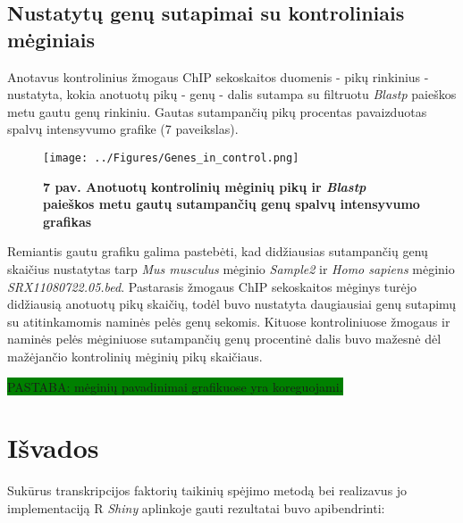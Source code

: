 \documentclass[12pt]{article}
\begin{document}
\newpage

\subsection{Nustatytų genų sutapimai su kontroliniais mėginiais}
Anotavus kontrolinius žmogaus ChIP sekoskaitos duomenis - pikų rinkinius -
nustatyta, kokia anotuotų pikų - genų - dalis sutampa su filtruotu \emph{Blastp}
paieškos metu gautu genų rinkiniu. Gautas sutampančių pikų procentas
pavaizduotas spalvų intensyvumo grafike (7 paveikslas).

\begin{figure}[ht]
    \begin{center}
        \captionsetup{justification=centering}
        \texttt{[image: ../Figures/Genes\_in\_control.png]}
        \vspace{-1.5\baselineskip}
        \caption*{\small\textbf{7 pav. Anotuotų kontrolinių mėginių pikų ir
                                \emph{Blastp} paieškos metu gautų sutampančių
                                genų spalvų intensyvumo grafikas}}
    \end{center}
\end{figure}

Remiantis gautu grafiku galima pastebėti, kad didžiausias sutampančių genų
skaičius nus\-ta\-ty\-tas tarp \emph{Mus musculus} mėginio \emph{Sample2} ir
\emph{Homo sapiens} mėginio \emph{SRX11080722.05.bed}. Pas\-ta\-ra\-sis žmogaus
ChIP sekoskaitos mėginys turėjo didžiausią anotuotų pikų skaičių, todėl 
buvo nustatyta daugiausiai genų sutapimų su atitinkamomis naminės pelės genų
sekomis. Kituose kontroliniuose žmogaus ir naminės pelės mėginiuose sutampančių
genų procentinė dalis buvo mažesnė dėl mažėjančio kontrolinių mėginių pikų
skaičiaus.

\colorbox{green}{PASTABA: mėginių pavadinimai grafikuose yra koreguojami.}

\newpage


\section{Išvados}
Sukūrus transkripcijos faktorių taikinių spėjimo metodą bei realizavus jo
implementaciją R \emph{Shiny} aplinkoje gauti rezultatai buvo apibendrinti:
\end{document}
